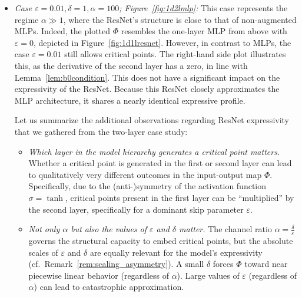 \documentclass[10pt]{article}
\theoremstyle{definition}
\numberwithin{equation}{section}
\newcommand{\eps}{\varepsilon}
\begin{document}
\begin{itemize}
  \item \emph{Case $\eps = 0.01, \delta = 1, \alpha = 100$;     Figure~\ref{fig:1d2lmlp}:} This case represents the regime $\alpha \gg 1$, where the ResNet's structure is close to that of non-augmented MLPs. Indeed, the plotted $\Phi$ resembles the one-layer MLP from above with $\eps = 0$, depicted in Figure~\ref{fig:1d1lresnet}. However, in contrast to MLPs, the case $\eps = 0.01$ still allows critical points. The right-hand side plot illustrates this, as the derivative of the second layer has a zero, in line with Lemma~\ref{lem:b0condition}. This does not have a significant impact on the expressivity of the ResNet. Because this ResNet closely approximates the MLP architecture, it shares a nearly identical expressive profile.






Let us summarize the additional observations regarding ResNet expressivity that we gathered from the two-layer case study:
\begin{itemize}
    \item \emph{Which layer in the model hierarchy generates a critical point matters.} Whether a critical point is generated in the first or second layer can lead to qualitatively very different outcomes in the input-output map $\Phi$. Specifically, due to the (anti-)symmetry of the activation function $\sigma = \tanh$, critical points present in the first layer can be ``multiplied'' by the second layer, specifically for a dominant skip parameter $\eps$.
    \item \emph{Not only $\alpha$ but also the values of $\eps$ and $\delta$ matter.} The channel ratio $\alpha = \frac{\delta}{\eps}$ governs the structural capacity to embed critical points, but the absolute scales of $\eps$ and $\delta$ are equally relevant for the model's expressivity (cf.~Remark~\ref{rem:scaling_asymmetry}). A small $\delta$ forces $\Phi$ toward near piecewise linear behavior (regardless of $\alpha$). Large values of $\eps$ (regardless of $\alpha$) can lead to catastrophic approximation.


\end{itemize}
\end{itemize}
\end{document}
